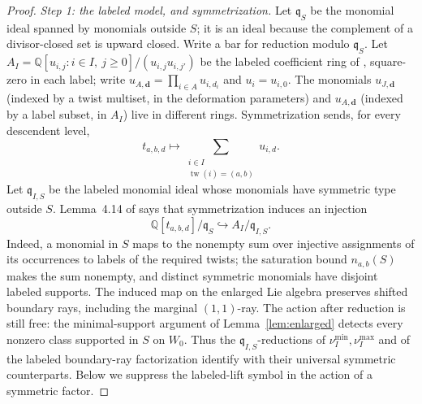 \documentclass[11pt]{amsart}
\theoremstyle{definition}
\theoremstyle{remark}
\newcommand{\QQ}{\mathbb{Q}}
\begin{document}
\begin{proof}
\emph{Step 1: the labeled model, and symmetrization.}
Let $\mathfrak q_S$ be the monomial ideal spanned by monomials outside $S$;
it is an ideal because the complement of a divisor-closed set is upward
closed.  Write a bar for reduction modulo $\mathfrak q_S$. Let
$A_I=\QQ[u_{i,j}:i\in I,\ j\ge0]/(u_{i,j}u_{i,j'})$ be the labeled
coefficient ring of \cite[Def.~4.6]{GKT}, square-zero in each label; write
$u_{A,\mathbf d}=\prod_{i\in A}u_{i,d_i}$ and $u_{i}=u_{i,0}$. The monomials
$u_{J,\mathbf d}$ (indexed by a twist multiset, in the deformation
parameters) and $u_{A,\mathbf d}$ (indexed by a label subset, in $A_{I}$)
live in different rings.
Symmetrization sends, for every descendent level,
\[
t_{a,b,d}\longmapsto
\sum_{\substack{i\in I\\\operatorname{tw}(i)=(a,b)}}u_{i,d}.
\]
Let $\mathfrak q_{I,S}$ be the labeled monomial ideal whose monomials have
symmetric type outside $S$.  Lemma~4.14 of \cite{GKT} says that symmetrization induces
an injection
\[
 \QQ[t_{a,b,d}]/\mathfrak q_S\hookrightarrow A_I/\mathfrak q_{I,S}.
\]
Indeed, a monomial in $S$ maps to the nonempty sum over injective assignments
of its occurrences to labels of the required twists; the saturation bound
$n_{a,b}(S)$ makes the sum nonempty, and distinct symmetric monomials have
disjoint labeled supports. The induced
map on the enlarged Lie algebra preserves shifted boundary rays, including the
marginal $(1,1)$-ray. The action after reduction is still free: the
minimal-support argument of Lemma~\ref{lem:enlarged} detects every nonzero
class supported in $S$ on $W_0$.
Thus the $\mathfrak q_{I,S}$-reductions of $\nu_I^{\min},\nu_I^{\max}$ and of the labeled
boundary-ray factorization identify with their universal symmetric counterparts. Below we
suppress the labeled-lift symbol in the action of a symmetric factor.


\end{proof}
\end{document}
